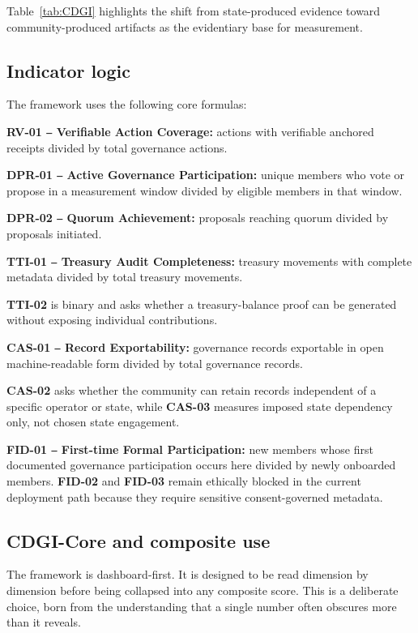 \documentclass[sigconf,anonymous]{acmart}
\begin{document}
Table~\ref{tab:CDGI} highlights the shift from state-produced evidence toward community-produced artifacts as the evidentiary base for measurement.

\subsection{Indicator logic}

The framework uses the following core formulas:

\textbf{RV-01 ‒ Verifiable Action Coverage:} actions with verifiable anchored receipts divided by total governance actions.

\textbf{DPR-01 ‒ Active Governance Participation:} unique members who vote or propose in a measurement window divided by eligible members in that window.

\textbf{DPR-02 ‒ Quorum Achievement:} proposals reaching quorum divided by proposals initiated.

\textbf{TTI-01 ‒ Treasury Audit Completeness:} treasury movements with complete metadata divided by total treasury movements.

\textbf{TTI-02} is binary and asks whether a treasury-balance proof can be generated without exposing individual contributions.

\textbf{CAS-01 ‒ Record Exportability:} governance records exportable in open machine-readable form divided by total governance records.

\textbf{CAS-02} asks whether the community can retain records independent of a specific operator or state, while \textbf{CAS-03} measures imposed state dependency only, not chosen state engagement.

\textbf{FID-01 ‒ First-time Formal Participation:} new members whose first documented governance participation occurs here divided by newly onboarded members. \textbf{FID-02} and \textbf{FID-03} remain ethically blocked in the current deployment path because they require sensitive consent-governed metadata.

\subsection{CDGI-Core and composite use}

The framework is dashboard-first. It is designed to be read dimension by dimension before being collapsed into any composite score. This is a deliberate choice, born from the understanding that a single number often obscures more than it reveals.
\end{document}
